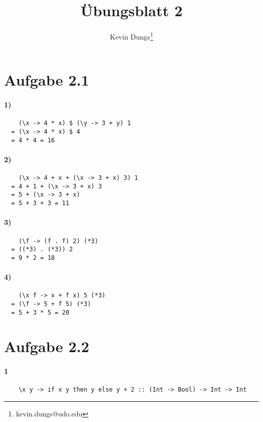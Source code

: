 \documentclass[a4paper]{scrartcl}
\title{Übungsblatt 2}
\author{Kevin Dungs\thanks{kevin.dungs@udo.edu}}
\begin{document}
\maketitle

\section{Aufgabe 2.1}
\paragraph{1)}
\begin{verbatim}
    (\x -> 4 * x) $ (\y -> 3 + y) 1
  = (\x -> 4 * x) $ 4
  = 4 * 4 = 16
\end{verbatim}

\paragraph{2)}
\begin{verbatim}
    (\x -> 4 + x + (\x -> 3 + x) 3) 1
  = 4 + 1 + (\x -> 3 + x) 3
  = 5 + (\x -> 3 + x)
  = 5 + 3 + 3 = 11
\end{verbatim}

\paragraph{3)}
\begin{verbatim}
    (\f -> (f . f) 2) (*3)
  = ((*3) . (*3)) 2
  = 9 * 2 = 18
\end{verbatim}

\paragraph{4)}
\begin{verbatim}
    (\x f -> x + f x) 5 (*3)
  = (\f -> 5 + f 5) (*3)
  = 5 + 3 * 5 = 20
\end{verbatim}


\section{Aufgabe 2.2}
\paragraph{1}
\begin{verbatim}
    \x y -> if x y then y else y + 2 :: (Int -> Bool) -> Int -> Int
\end{verbatim}
\end{document}
